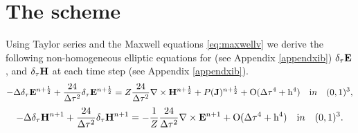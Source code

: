 \documentclass[12pt,reqno]{amsart}
\newcommand{\e}{{\bf E}}
\newcommand{\h}{{\bf H}}
\newcommand{\J}{{\bf J}}
\theoremstyle{definition}
\numberwithin{equation}{section}
\begin{document}
   
	\section{The scheme}
	Using  Taylor series and the Maxwell equations \eqref{eq:maxwellv} we derive the following non-homogeneous elliptic equations for (see Appendix \ref{appendxib})
$	\delta_{\tau} \bf{E}$, and $\delta_{\tau} \bf{H}$
at each time step
(see Appendix \ref{appendxib}).
	$$
	-\Delta\delta_{\tau} \e^{n+\frac{1}{2}}+\frac{24}{\Delta \tau^2}\delta_{\tau}\e^{n+\frac{1}{2}}=
	Z\frac{24}{\Delta \tau^2}\nabla\times \h^{n+\frac{1}{2}}+P(\J)^{n+\frac{1}{2}}+
	\mathrm{O(\Delta \tau^4+h^4)} \quad {\mathrm in} \quad (0,1)^3,
	$$
		$$
	-\Delta \delta_{\tau}\h^{n+1}+\frac{24}{\Delta \tau^2}\delta_{\tau}\h^{n+1}=
	-\frac{1}{Z}\frac{24}{\Delta \tau^2}\nabla\times \e^{n+1}+
	\mathrm{O(\Delta \tau^4+h^4)} \quad {\mathrm in} \quad (0,1)^3.
	$$
\end{document}
